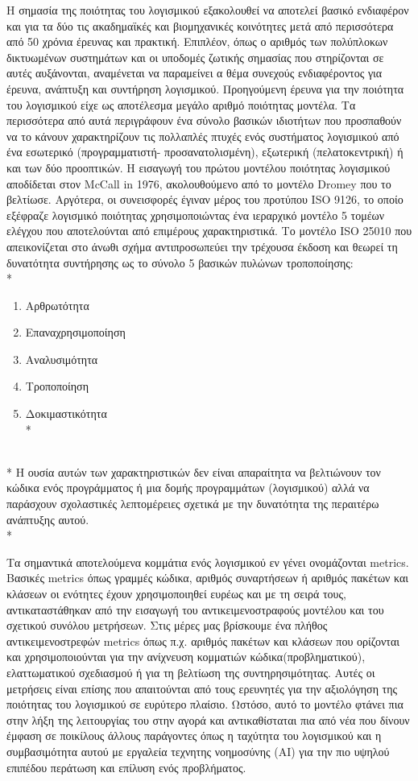\documentclass[a4paper, 11pt]{article}
\begin{document}
{{Η σημασία της ποιότητας του λογισμικού εξακολουθεί να αποτελεί βασικό ενδιαφέρον και για τα δύο
τις ακαδημαϊκές και βιομηχανικές κοινότητες μετά από περισσότερα από 50 χρόνια έρευνας
και πρακτική. Επιπλέον, όπως ο αριθμός των πολύπλοκων δικτυωμένων συστημάτων και
οι υποδομές ζωτικής σημασίας που στηρίζονται σε αυτές αυξάνονται, αναμένεται να παραμείνει α
θέμα συνεχούς ενδιαφέροντος για έρευνα, ανάπτυξη και συντήρηση λογισμικού.
Προηγούμενη έρευνα για την ποιότητα του λογισμικού είχε ως αποτέλεσμα μεγάλο αριθμό ποιότητας
μοντέλα. Τα περισσότερα από αυτά περιγράφουν ένα σύνολο βασικών ιδιοτήτων που προσπαθούν να το κάνουν
χαρακτηρίζουν τις πολλαπλές πτυχές ενός συστήματος λογισμικού από ένα εσωτερικό (προγραμματιστή-
προσανατολισμένη), εξωτερική (πελατοκεντρική) ή και των δύο προοπτικών.
Η εισαγωγή του πρώτου μοντέλου ποιότητας λογισμικού αποδίδεται στον \textlatin{McCall} in
1976, ακολουθούμενο από το μοντέλο \textlatin{Dromey} που το βελτίωσε. Αργότερα,
οι συνεισφορές έγιναν μέρος του προτύπου  \textlatin{ISO 9126}, το οποίο εξέφραζε λογισμικό
ποιότητας χρησιμοποιώντας ένα ιεραρχικό μοντέλο 5 τομέων ελέγχου που αποτελούνται από επιμέρους χαρακτηριστικά. Το μοντέλο  \textlatin{ISO 25010} που απεικονίζεται στο άνωθι σχήμα αντιπροσωπεύει την τρέχουσα έκδοση και θεωρεί τη δυνατότητα συντήρησης ως το σύνολο 5 βασικών
πυλώνων τροποποίησης: \\*
\begin{enumerate}
\item Αρθρωτότητα
\item Επαναχρησιμοποίηση
\item Αναλυσιμότητα
\item  Τροποποίηση
\item Δοκιμαστικότητα\\*
\end{enumerate}
\\*
Η ουσία αυτών των χαρακτηριστικών δεν είναι απαραίτητα να βελτιώνουν τον κώδικα ενός προγράμματος ή μια δομής προγραμμάτων (λογισμικού) αλλά να παράσχουν σχολαστικές λεπτομέρειες σχετικά με την δυνατότητα της περαιτέρω ανάπτυξης αυτού.\\*

Τα σημαντικά αποτελούμενα κομμάτια ενός λογισμικού εν γένει ονομάζονται \textlatin{metrics}.
Βασικές \textlatin{metrics} όπως γραμμές κώδικα, αριθμός συναρτήσεων ή αριθμός πακέτων και κλάσεων
οι ενότητες έχουν χρησιμοποιηθεί ευρέως και με τη σειρά τους, αντικαταστάθηκαν από την εισαγωγή του αντικειμενοστραφούς μοντέλου  και του σχετικού συνόλου μετρήσεων. Στις μέρες μας βρίσκουμε ένα
πλήθος αντικειμενοστρεφών \textlatin{metrics} όπως π.χ. αριθμός πακέτων και κλάσεων που ορίζονται και χρησιμοποιούνται για την ανίχνευση κομματιών κώδικα(προβληματικού),
ελαττωματικού σχεδιασμού ή για τη βελτίωση της συντηρησιμότητας. Αυτές οι μετρήσεις είναι επίσης
που απαιτούνται από τους ερευνητές για την αξιολόγηση της ποιότητας του λογισμικού σε ευρύτερο πλαίσιο. Ωστόσο, αυτό το μοντέλο φτάνει πια στην λήξη της λειτουργίας του στην αγορά και αντικαθίσταται πια από νέα που δίνουν έμφαση σε ποικίλους άλλους παράγοντες όπως η ταχύτητα του λογισμικού και η συμβασιμότητα αυτού με εργαλεία τεχνητης νοημοσύνης (ΑΙ) για την πιο υψηλού επιπέδου περάτωση και επίλυση ενός προβλήματος. 

}}
\end{document}
